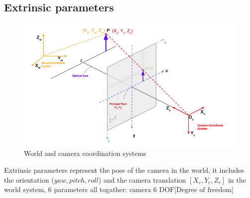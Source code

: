 \documentclass{article}
\begin{document}
\subsection{Extrinsic parameters}
\begin{figure}[h!]
\centering
\includegraphics[scale=1.7]{cameraCord.png}
\caption{World and camera coordination systems}
\label{fig:sr}
\end{figure}
Extrinsic parameters represent the pose of the camera in the world, it includes the orientation ($yaw,pitch,roll$) and the camera translation $\left[	 X_c,Y_c,Z_c \right]$ in the world system, 6 parameters all togather: $\textrm{camera 6 DOF[Degree of freedom]}$
\end{document}
